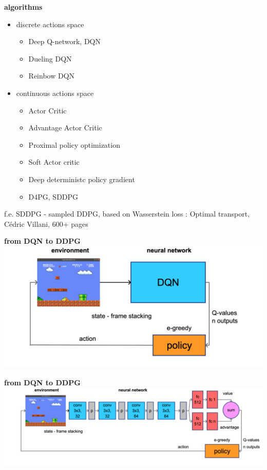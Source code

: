 \documentclass[xcolor=dvipsnames]{beamer}
\begin{document}
\begin{frame}{\bf algorithms}
   \begin{itemize}
    \item discrete actions space

        \begin{itemize}
          \item Deep Q-network, DQN
          \item Dueling DQN
          \item Reinbow DQN
        \end{itemize}

    \item continuous actions space
    
        \begin{itemize}
          \item Actor Critic
          \item Advantage Actor Critic
          \item Proximal policy optimization
          \item Soft Actor critic
          \item Deep deterministc policy gradient
          \item D4PG, SDDPG
        \end{itemize}
    
  \end{itemize}

  f.e. SDDPG - sampled DDPG, based on Wasserstein loss : Optimal transport, Cédric Villani, 600+ pages

\end{frame}


\begin{frame}{\bf from DQN to DDPG}
  {\centering \includegraphics[scale=0.2]{../diagrams/dqn.png}}
\end{frame}

\begin{frame}{\bf from DQN to DDPG}
  {\centering \includegraphics[scale=0.15]{../diagrams/dqndetail.png}}
\end{frame}
\end{document}
